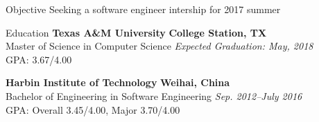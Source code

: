 \documentclass{resume} %
\begin{document}
\begin{rSection}{Objective}
Seeking a software engineer intership for 2017 summer
\end{rSection}

\begin{rSection}{Education}
{\bf Texas A\&M University} \hfill {\bf College Station, TX} 
\\ Master of Science in Computer Science \hfill {\em Expected Graduation: May, 2018}
\\ GPA: 3.67/4.00
\vspace*{-0.2em}

{\bf Harbin Institute of Technology} \hfill {\bf Weihai, China} 
\\ Bachelor of Engineering in Software Engineering \hfill {\em Sep. 2012--July 2016}
\\ GPA: Overall 3.45/4.00, Major 3.70/4.00



\end{rSection}



\end{document}
